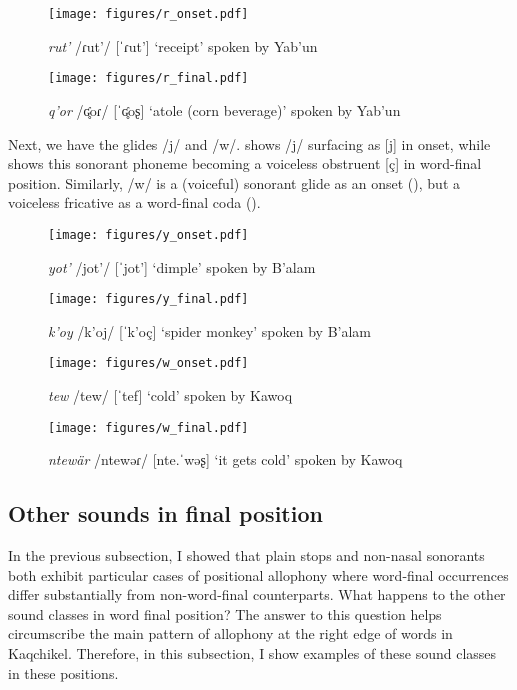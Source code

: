 \documentclass[output=paper,colorlinks,citecolor=brown]{langscibook}
\begin{document}
\begin{figure}
\texttt{[image: figures/r\_onset.pdf]}
\caption{\emph{rut’} /ɾut’/ [ˈɾut’] ‘receipt’ spoken by Yab’un}
\label{r_onset}
\end{figure}

\begin{figure}
\texttt{[image: figures/r\_final.pdf]}
\caption{\emph{q’or} /ʛ̥oɾ/ [ˈʛ̥oʂ] ‘atole (corn beverage)’ spoken by Yab’un}
\label{r_final}
\end{figure}

Next, we have the glides /j/ and /w/.  shows /j/ surfacing as [j] in onset, while  shows this sonorant phoneme becoming a voiceless obstruent [ç] in word-final position. 
Similarly, /w/ is a (voiceful) sonorant glide as an onset (), but a voiceless fricative as a word-final coda ().

\begin{figure}
\texttt{[image: figures/y\_onset.pdf]}
\caption{\emph{yot’} /jot’/ [ˈjot’] ‘dimple’ spoken by B’alam}
\label{y_onset}
\end{figure}

\begin{figure}
\texttt{[image: figures/y\_final.pdf]}
\caption{\emph{k’oy} /k’oj/ [ˈk’oç] ‘spider monkey’ spoken by B’alam}
\label{y_final}
\end{figure}

\begin{figure}
\texttt{[image: figures/w\_onset.pdf]}
\caption{ \emph{tew} /tew/ [ˈtef] ‘cold’ spoken by Kawoq}
\label{w_onset}
\end{figure}

\clearpage

\begin{figure}
\texttt{[image: figures/w\_final.pdf]}
\caption{ \emph{ntewär} /ntewəɾ/ [nte.ˈwəʂ] ‘it gets cold’ spoken by Kawoq}
\label{w_final}
\end{figure}


\subsection{Other sounds in final position}\label{Other sounds in final position}
In the previous subsection, I showed that plain stops and non-nasal sonorants both exhibit particular cases of positional allophony where word-final occurrences differ substantially from non-word-final counterparts. What happens to the other sound classes in word final position? The answer to this question helps circumscribe the main pattern of allophony at the right edge of words in Kaqchikel. Therefore, in this subsection, I show examples of these sound classes in these positions.
\end{document}
